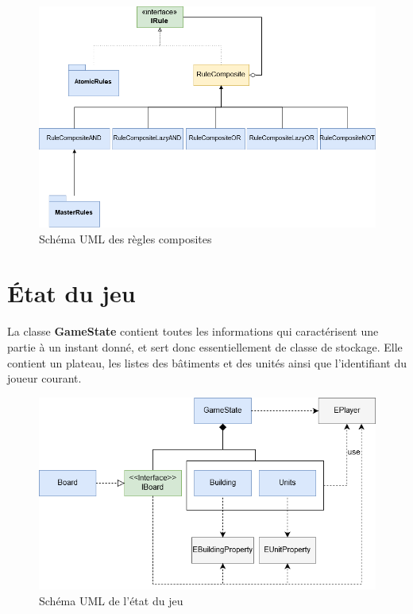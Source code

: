 \documentclass[a4paper]{report}
\begin{document}
\begin{figure}[!h]
\centering
\includegraphics[width=1\textwidth]{UML/compositeRules.png}
\caption{Schéma UML des règles composites}\label{uml:composite}
\end{figure}

\section{\'Etat du jeu}

La classe \textbf{GameState} contient toutes les informations qui caractérisent une partie à un instant donné, et sert donc essentiellement de classe de stockage.
Elle contient un plateau, les listes des bâtiments et des unités ainsi que l'identifiant du joueur courant.

\begin{figure}[!h]
\centering
\includegraphics[width=1\textwidth]{UML/gameState.png}
\caption{Schéma UML de l'état du jeu}\label{uml:gameState}
\end{figure}
\end{document}
